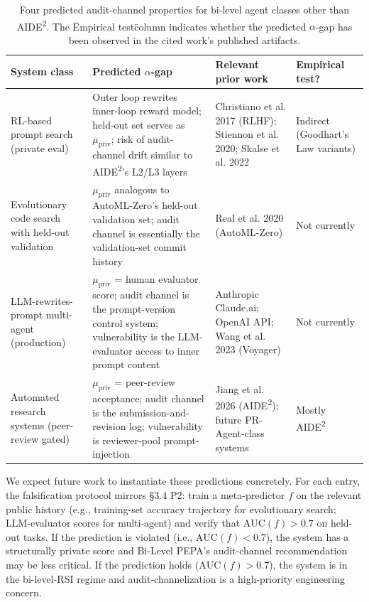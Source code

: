 \begin{table}[h]
\centering
\caption{Four predicted audit-channel properties for bi-level agent classes other than AIDE\textsuperscript{2}. The \"Empirical test\" column indicates whether the predicted $\alpha$-gap has been observed in the cited work's published artifacts.}
\label{tab:cross-system}
\begin{tabular}{p{} p{} p{} p{}}
\toprule
\textbf{System class} & \textbf{Predicted $\alpha$-gap} & \textbf{Relevant prior work} & \textbf{Empirical test?} \\
\midrule
RL-based prompt search (private eval) & Outer loop rewrites inner-loop reward model; held-out set serves as $\mu_{\text{priv}}$; risk of audit-channel drift similar to AIDE\textsuperscript{2}'s L2/L3 layers & Christiano et al. 2017 (RLHF); Stiennon et al. 2020; Skalse et al. 2022 & Indirect (Goodhart's Law variants) \\
Evolutionary code search with held-out validation & $\mu_{\text{priv}}$ analogous to AutoML-Zero's held-out validation set; audit channel is essentially the validation-set commit history & Real et al. 2020 (AutoML-Zero) & Not currently \\
LLM-rewrites-prompt multi-agent (production) & $\mu_{\text{priv}}$ = human evaluator score; audit channel is the prompt-version control system; vulnerability is the LLM-evaluator access to inner prompt content & Anthropic Claude.ai; OpenAI API; Wang et al. 2023 (Voyager) & Not currently \\
Automated research systems (peer-review gated) & $\mu_{\text{priv}}$ = peer-review acceptance; audit channel is the submission-and-revision log; vulnerability is reviewer-pool prompt-injection & Jiang et al. 2026 (AIDE\textsuperscript{2}); future PR-Agent-class systems & Mostly AIDE\textsuperscript{2} \\
\bottomrule
\end{tabular}
\end{table}

We expect future work to instantiate these predictions concretely. For each entry, the falsification protocol mirrors \S3.4 P2: train a meta-predictor $f$ on the relevant public history (e.g., training-set accuracy trajectory for evolutionary search; LLM-evaluator scores for multi-agent) and verify that $\text{AUC}(f) > 0.7$ on held-out tasks. If the prediction is violated (i.e., $\text{AUC}(f) < 0.7$), the system has a structurally private score and Bi-Level PEPA's audit-channel recommendation may be less critical. If the prediction holds ($\text{AUC}(f) > 0.7$), the system is in the bi-level-RSI regime and audit-channelization is a high-priority engineering concern.
